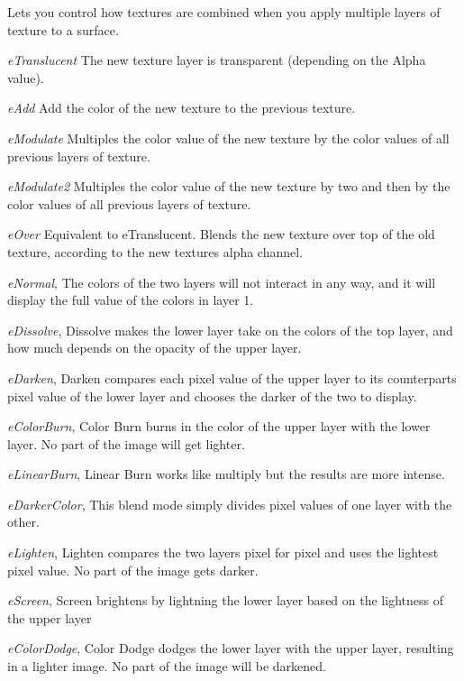 Lets you control how textures are combined when you apply multiple layers of texture to a surface.
\begin{DoxyItemize}
\item {\itshape e\+Translucent} The new texture layer is transparent (depending on the Alpha value).
\item {\itshape e\+Add} Add the color of the new texture to the previous texture.
\item {\itshape e\+Modulate} Multiples the color value of the new texture by the color values of all previous layers of texture.
\item {\itshape e\+Modulate2} Multiples the color value of the new texture by two and then by the color values of all previous layers of texture.
\item {\itshape e\+Over} Equivalent to e\+Translucent. Blends the new texture over top of the old texture, according to the new texture\textquotesingle{}s alpha channel.
\item {\itshape e\+Normal}, The colors of the two layers will not interact in any way, and it will display the full value of the colors in layer 1.
\item {\itshape e\+Dissolve}, Dissolve makes the lower layer take on the colors of the top layer, and how much depends on the opacity of the upper layer.
\item {\itshape e\+Darken}, Darken compares each pixel value of the upper layer to its counterpart\textquotesingle{}s pixel value of the lower layer and chooses the darker of the two to display.
\item {\itshape e\+Color\+Burn}, Color Burn burns in the color of the upper layer with the lower layer. No part of the image will get lighter.
\item {\itshape e\+Linear\+Burn}, Linear Burn works like multiply but the results are more intense.
\item {\itshape e\+Darker\+Color}, This blend mode simply divides pixel values of one layer with the other.
\item {\itshape e\+Lighten}, Lighten compares the two layers pixel for pixel and uses the lightest pixel value. No part of the image gets darker.
\item {\itshape e\+Screen}, Screen brightens by lightning the lower layer based on the lightness of the upper layer
\item {\itshape e\+Color\+Dodge}, Color Dodge dodges the lower layer with the upper layer, resulting in a lighter image. No part of the image will be darkened.

\end{DoxyItemize}
